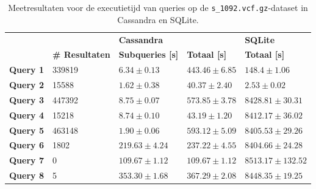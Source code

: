\begin{table}[h]
\begin{tabular}{@{}lllll@{}}
\cmidrule(l){3-5}
                              &         & \multicolumn{2}{|l|}{\textbf{Cassandra}}                                                      & \multicolumn{1}{l|}{\textbf{SQLite}}                             \\ 
\cmidrule(l){2-5}
\multicolumn{1}{l|}{}  & \multicolumn{1}{l|}{\textbf{\# Resultaten}}               & \multicolumn{1}{l|}{\textbf{Subqueries [s]}} & \multicolumn{1}{l|}{\textbf{Totaal [s]}} & \multicolumn{1}{l|}{\textbf{Totaal [s]}} \\ \midrule
\multicolumn{1}{|l|}{\textbf{Query 1}} & \multicolumn{1}{l|}{339819} & \multicolumn{1}{l|}{$6.34 \pm 0.13$}             & \multicolumn{1}{l|}{$443.46 \pm 6.85$}          & \multicolumn{1}{l|}{$148.4 \pm 1.06$}                          \\
\multicolumn{1}{|l|}{\textbf{Query 2}} & \multicolumn{1}{l|}{15588} & \multicolumn{1}{l|}{$1.62 \pm 0.38$}             & \multicolumn{1}{l|}{$40.37 \pm 2.40$}          & \multicolumn{1}{l|}{$2.53 \pm 0.02$}                          \\
\multicolumn{1}{|l|}{\textbf{Query 3}} & \multicolumn{1}{l|}{447392} &\multicolumn{1}{l|}{$8.75 \pm 0.07$}            & \multicolumn{1}{l|}{$573.85 \pm 3.78$}          & \multicolumn{1}{l|}{$8428.81 \pm 30.31$}                        \\
\multicolumn{1}{|l|}{\textbf{Query 4}} & \multicolumn{1}{l|}{15218} &\multicolumn{1}{l|}{$8.74 \pm 0.10$}            & \multicolumn{1}{l|}{$43.19 \pm 1.20$}            & \multicolumn{1}{l|}{$8412.17 \pm 36.02$}                        \\
\multicolumn{1}{|l|}{\textbf{Query 5}} & \multicolumn{1}{l|}{463148} &\multicolumn{1}{l|}{$1.90 \pm 0.06$}            & \multicolumn{1}{l|}{$593.12 \pm 5.09$}           & \multicolumn{1}{l|}{$8405.53 \pm 29.26$}                        \\
\multicolumn{1}{|l|}{\textbf{Query 6}} & \multicolumn{1}{l|}{1802} &\multicolumn{1}{l|}{$219.63 \pm 4.24$}                 & \multicolumn{1}{l|}{$237.22 \pm 4.55$}                    & \multicolumn{1}{l|}{$8404.66 \pm 24.28$}                        \\
\multicolumn{1}{|l|}{\textbf{Query 7}} & \multicolumn{1}{l|}{0} &\multicolumn{1}{l|}{$109.67 \pm 1.12$}          & \multicolumn{1}{l|}{$109.67 \pm 1.12$}           & \multicolumn{1}{l|}{$8513.17 \pm 132.52$}                        \\
\multicolumn{1}{|l|}{\textbf{Query 8}} & \multicolumn{1}{l|}{5} &\multicolumn{1}{l|}{$353.30 \pm 1.68$} & \multicolumn{1}{l|}{$367.29 \pm 2.08$}       & \multicolumn{1}{l|}{$8448.35 \pm 19.25$}                                \\ 
\bottomrule
\end{tabular}
\caption{Meetresultaten voor de executietijd van queries op de \texttt{s\_1092.vcf.gz}-dataset in Cassandra en SQLite.}
\end{table}

